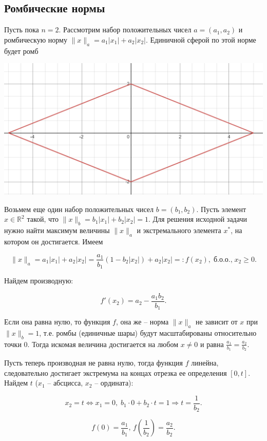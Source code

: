 \documentclass{article}
\begin{document}
\subsection{Ромбические нормы}
Пусть пока $n=2$. Рассмотрим набор положительных чисел $a=(a_1, a_2)$ и ромбическую норму $\|x\|_a = a_1|x_1|+a_2|x_2|$. Единичной сферой по этой норме будет ромб

\begin{center}
\includegraphics[scale = 0.45]{rhombus.png} 
\end{center}

Возьмем еще один набор положительных чисел $b = (b_1, b_2)$. Пусть элемент $x \in \mathbb{R}^2$ такой, что $\|x\|_b = b_1|x_1|+b_2|x_2| = 1$. Для решения исходной задачи нужно найти максимум величины $\|x\|_a$ и экстремального элемента $x^*$, на котором он достигается. Имеем

$$ \|x\|_a = a_1|x_1| + a_2|x_2| = \frac{a_1}{b_1}(1-b_2|x_2|) + a_2|x_2| =: f(x_2), \; \text{б.о.о.,} \; x_2 \geq 0. $$

Найдем производную: 

$$ f'(x_2) = a_2 - \frac{a_1b_2}{b_1}. $$

Если она равна нулю, то функция $f$, она же -- норма $\|x\|_a$ не зависит от $x$ при $\|x\|_b = 1$, т.е. ромбы (единичные шары) будут масштабированы относительно точки $0$. Тогда искомая величина достигается на любом $x \neq 0$ и равна $ \frac{a_1}{b_1} = \frac{a_2}{b_2}$.

Пусть теперь производная не равна нулю, тогда функция $f$ линейна, следовательно достигает экстремума на концах отрезка ее определения $[0, t].$ Найдем $t$ ($x_1$ -- абсцисса, $x_2$ -- ордината):

$$ x_2 = t \Leftrightarrow x_1 = 0, \; b_1 \cdot 0 + b_2 \cdot t = 1 \Rightarrow t = \frac{1}{b_2}.$$

$$ f(0) = \frac{a_1}{b_1}, \, f\left(\frac{1}{b_2}\right) = \frac{a_2}{b_2}. $$
\end{document}
